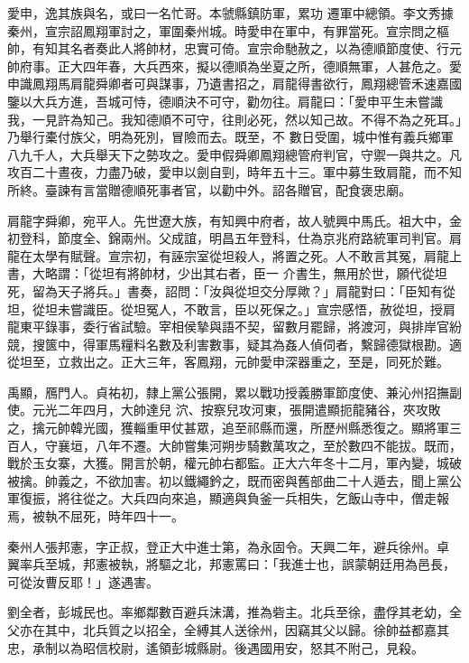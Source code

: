 \begin{pinyinscope}
 愛申，逸其族與名，或曰一名忙哥。本虢縣鎮防軍，累功
 遷軍中總領。李文秀據秦州，宣宗詔鳳翔軍討之，軍圍秦州城。時愛申在軍中，有罪當死。宣宗問之樞帥，有知其名者奏此人將帥材，忠實可倚。宣宗命馳赦之，以為德順節度使、行元帥府事。正大四年春，大兵西來，擬以德順為坐夏之所，德順無軍，人甚危之。愛申識鳳翔馬肩龍舜卿者可與謀事，乃遺書招之，肩龍得書欲行，鳳翔總管禾速嘉國鑒以大兵方進，吾城可恃，德順決不可守，勸勿往。肩龍曰：「愛申平生未嘗識我，一見許為知己。我知德順不可守，往則必死，然以知己故。不得不為之死耳。」乃舉行橐付族父，明為死別，冒險而去。既至，不
 數日受圍，城中惟有義兵鄉軍八九千人，大兵舉天下之勢攻之。愛申假舜卿鳳翔總管府判官，守禦一與共之。凡攻百二十晝夜，力盡乃破，愛申以劍自剄，時年五十三。軍中募生致肩龍，而不知所終。臺諫有言當贈德順死事者官，以勸中外。詔各贈官，配食褒忠廟。



 肩龍字舜卿，宛平人。先世遼大族，有知興中府者，故人號興中馬氏。祖大中，金初登科，節度全、錦兩州。父成誼，明昌五年登科，仕為京兆府路統軍司判官。肩龍在太學有賦聲。宣宗初，有誣宗室從坦殺人，將置之死。人不敢言其冤，肩龍上書，大略謂：「從坦有將帥材，少出其右者，臣一
 介書生，無用於世，願代從坦死，留為天子將兵。」書奏，詔問：「汝與從坦交分厚歟？」肩龍對曰：「臣知有從坦，從坦未嘗識臣。從坦冤人，不敢言，臣以死保之。」宣宗感悟，赦從坦，授肩龍東平錄事，委行省試驗。宰相侯摯與語不契，留數月罷歸，將渡河，與排岸官紛競，搜篋中，得軍馬糧料名數及利害數事，疑其為姦人偵伺者，繫歸德獄根勘。適從坦至，立救出之。正大三年，客鳳翔，元帥愛申深器重之，至是，同死於難。



 禹顯，鴈門人。貞祐初，隸上黨公張開，累以戰功授義勝軍節度使、兼沁州招撫副使。元光二年四月，大帥達兒
 泬、按察兒攻河東，張開遣顯扼龍豬谷，夾攻敗之，擒元帥韓光國，獲輜重甲仗甚眾，追至祁縣而還，所歷州縣悉復之。顯將軍三百人，守襄垣，八年不遷。大帥嘗集河朔步騎數萬攻之，至於數四不能拔。既而，戰於玉女寨，大獲。開言於朝，權元帥右都監。正大六年冬十二月，軍內變，城破被擒。帥義之，不欲加害。初以鐵繩鈐之，既而密與舊部曲二十人遁去，聞上黨公軍復振，將往從之。大兵四向來追，顯適與負釜一兵相失，乞飯山寺中，僧走報焉，被執不屈死，時年四十一。



 秦州人張邦憲，字正叔，登正大中進士第，為永固令。天興二年，避兵徐州。卓
 翼率兵至城，邦憲被執，將驅之北，邦憲罵曰：「我進士也，誤蒙朝廷用為邑長，可從汝曹反耶！」遂遇害。



 劉全者，彭城民也。率鄉鄰數百避兵沫溝，推為砦主。北兵至徐，盡俘其老幼，全父亦在其中，北兵質之以招全，全縛其人送徐州，因竊其父以歸。徐帥益都嘉其忠，承制以為昭信校尉，遙領彭城縣尉。後遇國用安，怒其不附己，見殺。



\end{pinyinscope}